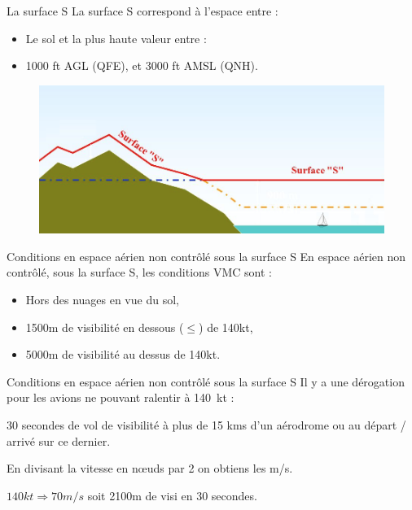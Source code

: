 \documentclass{beamer}
\begin{document}
\begin{frame}{La surface S}
  La surface S correspond à l'espace entre :

  \begin{itemize}
    \item Le sol et la plus haute valeur entre : \pause
    \item 1000 ft AGL (QFE), et 3000 ft AMSL (QNH). \pause
  \end{itemize}

  \pause
  \begin{figure}
    \centering
    \includegraphics[scale=1.2]{images/surface-s.png}
  \end{figure}
  
\end{frame}

\begin{frame}{Conditions en espace aérien non contrôlé sous la surface S}
  En espace aérien non contrôlé, sous la surface S, les conditions VMC sont :

  \pause
  
  \begin{itemize}
    \item Hors des nuages en vue du sol, \pause
    \item 1500m de visibilité en dessous ($\leq$) de 140kt, \pause
    \item 5000m de visibilité au dessus de 140kt.
  \end{itemize}

\end{frame}

\begin{frame}{Conditions en espace aérien non contrôlé sous la surface S} 
  Il y a une dérogation pour les avions ne pouvant ralentir à 140 kt :

  \vspace*{1em} \pause

  30 secondes de vol de visibilité à plus de 15 kms d'un aérodrome ou
  au départ / arrivé sur ce dernier.

  \vspace*{1em} \pause
  En divisant la vitesse en nœuds par 2 on obtiens les m/s.

  \vspace*{1em} \pause
  $140 kt \Rightarrow 70m/s$ soit 2100m de visi en 30 secondes.

  \vspace*{1em} \pause
  
\end{frame}
\end{document}
